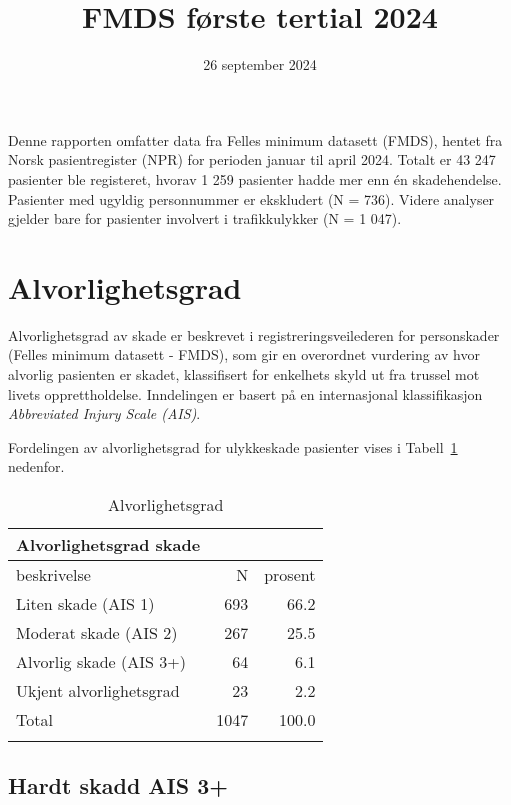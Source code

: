 \documentclass[
  letterpaper,
  DIV=11,
  numbers=noendperiod]{scrartcl}
\title{FMDS første tertial 2024}
\subtitle{26 september 2024}
\author{}
\date{}
\begin{document}
\maketitle


Denne rapporten omfatter data fra Felles minimum datasett (FMDS), hentet
fra Norsk pasientregister (NPR) for perioden januar til april 2024.
Totalt er 43 247 pasienter ble registeret, hvorav 1 259 pasienter hadde
mer enn én skadehendelse. Pasienter med ugyldig personnummer er
ekskludert (N = 736). Videre analyser gjelder bare for pasienter
involvert i trafikkulykker (N = 1 047).

\section{Alvorlighetsgrad}\label{alvorlighetsgrad}

Alvorlighetsgrad av skade er beskrevet i registreringsveilederen for
personskader (Felles minimum datasett - FMDS), som gir en overordnet
vurdering av hvor alvorlig pasienten er skadet, klassifisert for
enkelhets skyld ut fra trussel mot livets opprettholdelse. Inndelingen
er basert på en internasjonal klassifikasjon \emph{Abbreviated Injury
Scale (AIS)}.

Fordelingen av alvorlighetsgrad for ulykkeskade pasienter vises i
Tabell~\ref{tbl-alvorlig} nedenfor.

\begingroup
\fontsize{12.0pt}{14.4pt}\selectfont

\begin{longtable}{lrr}


\caption*{
{\large Alvorlighetsgrad skade}
} \\ 
\toprule
beskrivelse & N & prosent \\ 
\midrule\addlinespace[2.5pt]
Liten skade (AIS 1) & 693 & 66.2 \\ 
Moderat skade (AIS 2) & 267 & 25.5 \\ 
Alvorlig skade (AIS 3+) & 64 & 6.1 \\ 
Ukjent alvorlighetsgrad & 23 & 2.2 \\ 
Total & 1047 & 100.0 \\ 
\bottomrule

\caption{\label{tbl-alvorlig}Alvorlighetsgrad}

\tabularnewline
\end{longtable}

\endgroup

\subsection{Hardt skadd AIS 3+}\label{hardt-skadd-ais-3}
\end{document}
